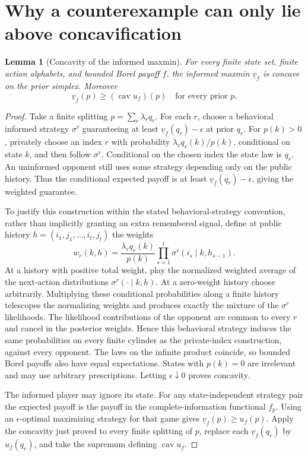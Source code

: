 \documentclass[11pt]{article}
\newtheorem{lemma}[theorem]{Lemma}
\theoremstyle{definition}
\DeclareMathOperator{\cav}{cav}
\begin{document}
\section*{Why a counterexample can only lie above concavification}
\begin{lemma}[Concavity of the informed maxmin]
For every finite state set, finite action alphabets, and bounded Borel payoff $f$, the informed maxmin $\underline v_f$ is concave on the prior simplex. Moreover
\[
 \underline v_f(p)\ge(\cav u_f)(p)
 \quad\text{for every prior }p.
\]
\end{lemma}
\begin{proof}
Take a finite splitting $p=\sum_r\lambda_r q_r$. For each $r$, choose a behavioral informed strategy $\sigma^r$ guaranteeing at least $\underline v_f(q_r)-\epsilon$ at prior $q_r$. For $p(k)>0$, privately choose an index $r$ with probability $\lambda_rq_r(k)/p(k)$, conditional on state $k$, and then follow $\sigma^r$. Conditional on the chosen index the state law is $q_r$. An uninformed opponent still uses some strategy depending only on the public history. Thus the conditional expected payoff is at least $\underline v_f(q_r)-\epsilon$, giving the weighted guarantee.

To justify this construction within the stated behavioral-strategy convention, rather than implicitly granting an extra remembered signal, define at public history $h=(i_1,j_1,\ldots,i_t,j_t)$ the weights
\[
 w_r(k,h)=\frac{\lambda_rq_r(k)}{p(k)}
             \prod_{s=1}^t\sigma^r(i_s\mid k,h_{s-1}).
\]
At a history with positive total weight, play the normalized weighted average of the next-action distributions $\sigma^r(\cdot\mid k,h)$. At a zero-weight history choose arbitrarily. Multiplying these conditional probabilities along a finite history telescopes the normalizing weights and produces exactly the mixture of the $\sigma^r$ likelihoods. The likelihood contributions of the opponent are common to every $r$ and cancel in the posterior weights. Hence this behavioral strategy induces the same probabilities on every finite cylinder as the private-index construction, against every opponent. The laws on the infinite product coincide, so bounded Borel payoffs also have equal expectations. States with $p(k)=0$ are irrelevant and may use arbitrary prescriptions. Letting $\epsilon\downarrow0$ proves concavity.

The informed player may ignore its state. For any state-independent strategy pair the expected payoff is the payoff in the complete-information functional $f_p$. Using an $\epsilon$-optimal maximizing strategy for that game gives $\underline v_f(p)\ge u_f(p)$. Apply the concavity just proved to every finite splitting of $p$, replace each $\underline v_f(q_r)$ by $u_f(q_r)$, and take the supremum defining $\cav u_f$.
\end{proof}
\end{document}
